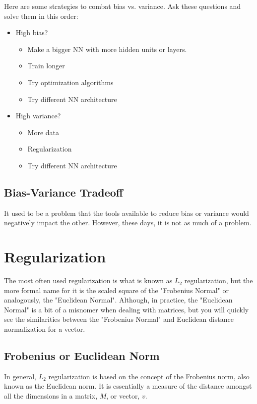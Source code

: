 \documentclass{article}
\begin{document}
Here are some strategies to combat bias vs. variance.  Ask these questions and solve them in this order:

\begin{itemize}
\item High bias?
  \begin{itemize}
  \item Make a bigger NN with more hidden units or layers.
  \item Train longer
  \item Try optimization algorithms
  \item Try different NN architecture
  \end{itemize}
\item High variance?
  \begin{itemize}
  \item More data
  \item Regularization
  \item Try different NN architecture
  \end{itemize}
\end{itemize}

\subsection{Bias-Variance Tradeoff}

It used to be a problem that the tools available to reduce bias or variance would negatively impact the other.  However, these days, it is not as much of a problem.

\section{Regularization}

The most often used regularization is what is known as $L_{2}$ regularization, but the more formal name for it is the scaled square of the "Frobenius Normal" or analogously, the "Euclidean Normal".  Although, in practice, the "Euclidean Normal" is a bit of a misnomer when dealing with matrices, but you will quickly see the similarities between the "Frobenius Normal" and Euclidean distance normalization for a vector.

\subsection{Frobenius or Euclidean Norm}

In general, $L_2$ regularization is based on the concept of the Frobenius norm, also known as the Euclidean norm.  It is essentially a measure of the distance amongst all the dimensions in a matrix, $M$, or vector, $v$.
\end{document}
